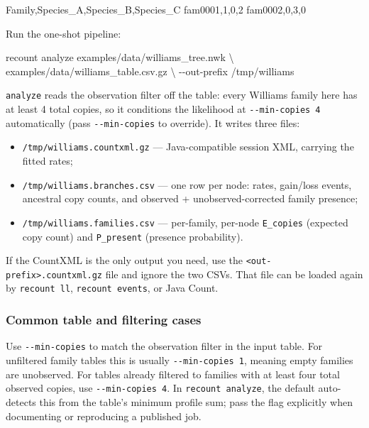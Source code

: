 \documentclass[
  10pt,
]{article}
\newenvironment{Shaded}{}{}
\newcommand{\AttributeTok}[1]{\textcolor[rgb]{0.49,0.56,0.16}{#1}}
\newcommand{\DataTypeTok}[1]{\textcolor[rgb]{0.56,0.13,0.00}{#1}}
\newcommand{\ExtensionTok}[1]{#1}
\newcommand{\NormalTok}[1]{#1}
\providecommand{\tightlist}{%
  \setlength{\itemsep}{0pt}\setlength{\parskip}{0pt}}
\begin{document}
\begin{Shaded}
\begin{Highlighting}[]
\NormalTok{Family,Species\_A,Species\_B,Species\_C}
\NormalTok{fam0001,1,0,2}
\NormalTok{fam0002,0,3,0}
\end{Highlighting}
\end{Shaded}

Run the one-shot pipeline:

\begin{Shaded}
\begin{Highlighting}[]
\ExtensionTok{recount}\NormalTok{ analyze examples/data/williams\_tree.nwk }\DataTypeTok{\textbackslash{}}
\NormalTok{                examples/data/williams\_table.csv.gz }\DataTypeTok{\textbackslash{}}
                \AttributeTok{{-}{-}out{-}prefix}\NormalTok{ /tmp/williams}
\end{Highlighting}
\end{Shaded}

\texttt{analyze} reads the observation filter off the table: every
Williams family here has at least 4 total copies, so it conditions the
likelihood at \texttt{-\/-min-copies\ 4} automatically (pass
\texttt{-\/-min-copies} to override). It writes three files:

\begin{itemize}
\tightlist
\item
  \texttt{/tmp/williams.countxml.gz} --- Java-compatible session XML,
  carrying the fitted rates;
\item
  \texttt{/tmp/williams.branches.csv} --- one row per node: rates,
  gain/loss events, ancestral copy counts, and observed +
  unobserved-corrected family presence;
\item
  \texttt{/tmp/williams.families.csv} --- per-family, per-node
  \texttt{E\_copies} (expected copy count) and \texttt{P\_present}
  (presence probability).
\end{itemize}

If the CountXML is the only output you need, use the
\texttt{\textless{}out-prefix\textgreater{}.countxml.gz} file and ignore
the two CSVs. That file can be loaded again by \texttt{recount\ ll},
\texttt{recount\ events}, or Java Count.

\subsubsection{Common table and filtering
cases}\label{common-table-and-filtering-cases}

Use \texttt{-\/-min-copies} to match the observation filter in the input
table. For unfiltered family tables this is usually
\texttt{-\/-min-copies\ 1}, meaning empty families are unobserved. For
tables already filtered to families with at least four total observed
copies, use \texttt{-\/-min-copies\ 4}. In \texttt{recount\ analyze},
the default auto-detects this from the table's minimum profile sum; pass
the flag explicitly when documenting or reproducing a published job.
\end{document}
